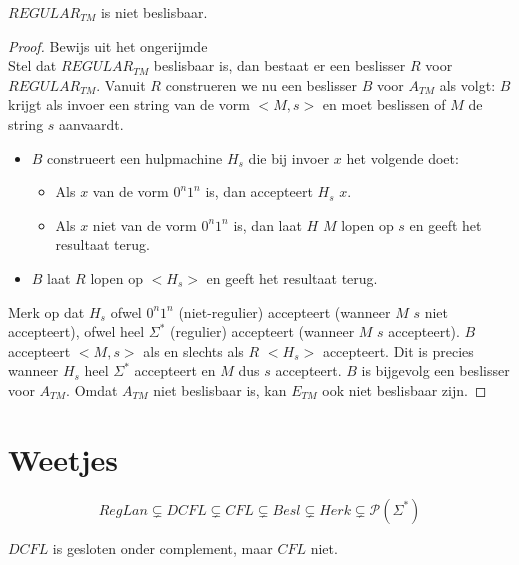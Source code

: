 \documentclass[main.tex]{subfiles}
\begin{document}
\begin{st}
  \label{st:regular-tm-niet-besl}
  $REGULAR_{TM}$ is niet beslisbaar.

  \begin{proof}
    Bewijs uit het ongerijmde\\
    Stel dat $REGULAR_{TM}$ beslisbaar is, dan bestaat er een beslisser $R$ voor $REGULAR_{TM}$.
    Vanuit $R$ construeren we nu een beslisser $B$ voor $A_{TM}$ als volgt:
    $B$ krijgt als invoer een string van de vorm $<M,s>$ en moet beslissen of $M$ de string $s$ aanvaardt.
    \begin{itemize}
    \item $B$ construeert een hulpmachine $H_{s}$ die bij invoer $x$ het volgende doet:
      \begin{itemize}
      \item Als $x$ van de vorm $0^{n}1^{n}$ is, dan accepteert $H_{s}$ $x$.
      \item Als $x$ niet van de vorm $0^{n}1^{n}$ is, dan laat $H$ $M$ lopen op $s$ en geeft het resultaat terug.
      \end{itemize}
    \item $B$ laat $R$ lopen op $<H_{s}>$ en geeft het resultaat terug.
    \end{itemize}
    Merk op dat $H_{s}$ ofwel $0^{n}1^{n}$ (niet-regulier) accepteert (wanneer $M$ $s$ niet accepteert), ofwel heel $\Sigma^{*}$ (regulier) accepteert (wanneer $M$ $s$ accepteert).
    $B$ accepteert $<M,s>$ als en slechts als $R$ $<H_{s}>$ accepteert.
    Dit is precies wanneer $H_{s}$ heel $\Sigma^{*}$ accepteert en $M$ dus $s$ accepteert.
    $B$ is bijgevolg een beslisser voor $A_{TM}$.
    Omdat $A_{TM}$ niet beslisbaar is, kan $E_{TM}$ ook niet beslisbaar zijn.
  \end{proof}
\end{st}


\section{Weetjes}
\label{sec:weetjes}

\begin{st}
  \[ RegLan \subsetneq DCFL \subsetneq CFL \subsetneq Besl \subsetneq Herk \subsetneq \mathcal{P}(\Sigma^{*}) \]
\end{st}

\begin{st}
  $DCFL$ is gesloten onder complement, maar $CFL$ niet. 
\end{st}
\end{document}
